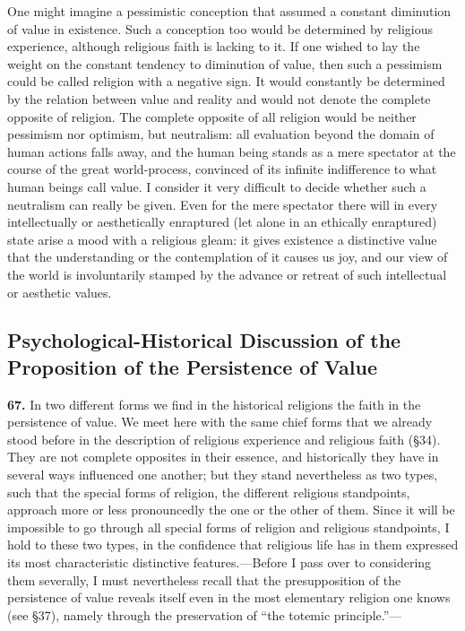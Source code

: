 \documentclass[12pt,a4paper]{book}
\newcommand{\opage}[1]{\marginnote{\footnotesize\textit{[#1]}}}
\begin{document}
One might imagine a pessimistic conception that assumed a constant diminution of value in existence. Such a
conception too would be determined by religious experience, although religious faith is lacking to it. If one
wished to lay the weight on the constant tendency to diminution of value, then such a pessimism could be called
religion with a negative sign. It would constantly be determined by the relation between value and reality and
would not denote the complete opposite of religion. The complete opposite of all religion would be neither
pessimism nor optimism, but neutralism: all evaluation beyond the domain of human actions falls away, and the
human being stands as a mere spectator at the course of the great world-process, convinced of its infinite
indifference to what human beings call value. I consider it very difficult to decide whether such a neutralism
can really be given. Even for the mere spectator there will in every intellectually or aesthetically enraptured
(let alone in an ethically enraptured) state arise a mood 
\opage{154}with a religious gleam: it gives existence a
distinctive value that the understanding or the contemplation of it causes us joy, and our view of the world is
involuntarily stamped by the advance or retreat of such intellectual or aesthetic values.

\subsection{Psychological-Historical Discussion of the Proposition
  of the Persistence of Value}
\label{ssec:value-psychological}

\noindent\textbf{67.} In two different forms we find in the historical religions the faith
in the persistence of value. We meet here with the same chief forms that we already stood
before in the description of religious experience and religious faith (§34). They are not
complete opposites in their essence, and historically they have in several ways influenced
one another; but they stand nevertheless as two types, such that the special forms of
religion, the different religious standpoints, approach more or less pronouncedly the one or
the other of them. Since it will be impossible to go through all special forms of religion
and religious standpoints, I hold to these two types, in the confidence that religious life
has in them expressed its most characteristic distinctive features.---Before I pass over to
considering them severally, I must nevertheless recall that the presupposition of the
persistence of value reveals itself even in the most elementary religion one knows (see §37),
namely through the preservation of ``the totemic principle.''---
\end{document}
